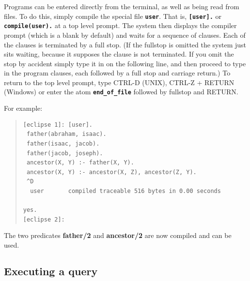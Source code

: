 Programs can be entered directly from the terminal, as well as being read
from files.
To do this, simply compile the special file {\bf \tt user}.
That is, {\bf \tt [user].} or {\bf \tt compile(user).} at a top level
prompt.
The system then displays the compiler prompt (which is a blank by default)
and waits for a sequence of clauses.
Each of the clauses is terminated by a full stop.
(If the fullstop is omitted the system just sits
waiting, because it supposes the clause is not terminated.
If you omit the stop by accident simply type it in on the following line,
and then proceed to type in the program clauses, each followed by a full
stop and carriage return.)
To return to the top level prompt,
type CTRL-D (UNIX), CTRL-Z + RETURN (Windows) or enter the atom
{\bf \tt end_of_file} followed by fullstop and RETURN.

For example:
\begin{quote}
\begin{verbatim}
[eclipse 1]: [user].
 father(abraham, isaac).
 father(isaac, jacob).
 father(jacob, joseph).
 ancestor(X, Y) :- father(X, Y).
 ancestor(X, Y) :- ancestor(X, Z), ancestor(Z, Y).
 ^D
  user       compiled traceable 516 bytes in 0.00 seconds

yes.
[eclipse 2]:
\end{verbatim}
\end{quote}
The two predicates {\bf father/2} and {\bf ancestor/2} are now compiled
and can be used.

\subsection{Executing a query}

